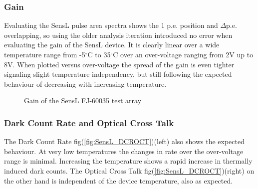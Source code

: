 \documentclass[12pt,article,type=msc,colorback,accentcolor=tud9c]{tudthesis}
\begin{document}
\begin{figure}[h]
\begin{centering}
}
\caption{SensL Test Array and pulse shape at bias-voltage = 29V0}
\label{fig:SensL_Array_PS}
\end{centering}
\end{figure}


\subsubsection{Gain}
\label{subsubsec:SensLGain}

Evaluating the SensL pulse area spectra shows the 1 p.e. position and $\Delta$p.e. overlapping, so using the older analysis iteration introduced no error when evaluating the gain of the SensL device. It is clearly linear over a wide temperature range from -5$^\circ$C to 35$^\circ$C over an over-voltage ranging from 2V up to 8V. When plotted versus over-voltage the spread of the gain is even tighter signaling slight temperature independency, but still following the expected behaviour of decreasing with increasing temperature.

\begin{figure}[h]
\begin{centering}
\caption{Gain of the SensL FJ-60035 test array}
\label{fig:SensL_Gain}
\end{centering}
\end{figure}


\subsubsection{Dark Count Rate and Optical Cross Talk}
\label{subsubsec:SensL_DCROCT}
The Dark Count Rate fig(\ref{fig:SensL_DCROCT})(left) also shows the expected behaviour. At very low temperatures the changes in rate over the over-voltage range is minimal. Increasing the temperature shows a rapid increase in thermally induced dark counts. The Optical Cross Talk fig(\ref{fig:SensL_DCROCT})(right) on the other hand is independent of the device temperature, also as expected. 
\end{document}

